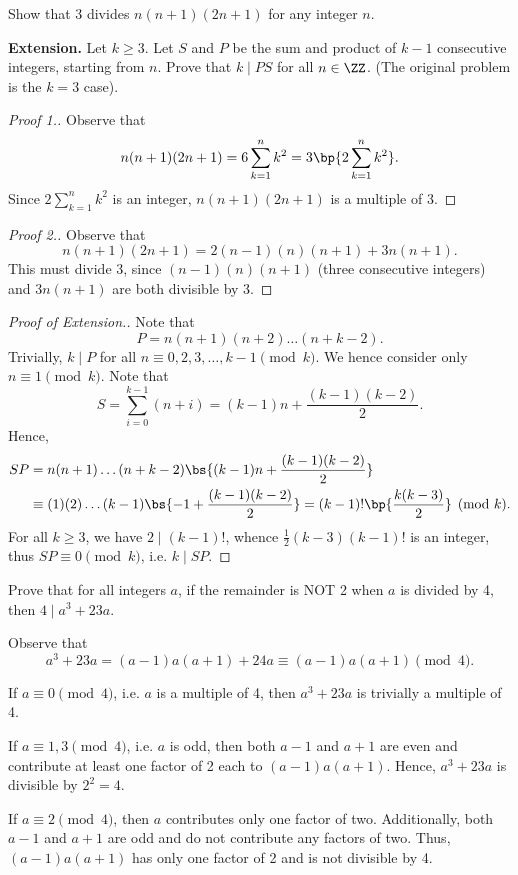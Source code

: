 \clearpage
\begin{problem}
    Show that 3 divides $n(n+1)(2n+1)$ for any integer $n$.

    \noindent\textbf{Extension.} Let $k \geq 3$. Let $S$ and $P$ be the sum and product of $k-1$ consecutive integers, starting from $n$. Prove that $k \mid PS$ for all $n \in \ZZ$. (The original problem is the $k = 3$ case).
\end{problem}
\begin{proof}[Proof 1.]
    Observe that \[n(n+1)(2n+1) = 6 \sum_{k = 1}^n k^2 = 3\bp{2\sum_{k = 1}^n k^2}.\] Since $2\sum_{k = 1}^n k^2$ is an integer, $n(n+1)(2n+1)$ is a multiple of 3.
\end{proof}
\begin{proof}[Proof 2.]
    Observe that \[n(n+1)(2n+1) = 2(n-1)(n)(n+1) + 3n(n+1).\] This must divide 3, since $(n-1)(n)(n+1)$ (three consecutive integers) and $3n(n+1)$ are both divisible by 3.
\end{proof}
\begin{proof}[Proof of Extension.]
    Note that \[P = n(n+1)(n+2)\dots(n+k-2).\] Trivially, $k \mid P$ for all $n \equiv 0, 2, 3, \dots, k-1 \pmod{k}$. We hence consider only $n \equiv 1 \pmod{k}$. Note that \[S = \sum_{i = 0}^{k-1} (n + i) = (k-1)n + \frac{(k-1)(k-2)}{2}.\] Hence,
    \begin{align*}
        SP &= n(n+1)\dots(n+k-2) \bs{(k-1)n + \frac{(k-1)(k-2)}{2}}\\
        &\equiv (1)(2)\dots(k-1) \bs{-1 + \frac{(k-1)(k-2)}{2}} = (k-1)! \bp{\frac{k(k-3)}{2}} \pmod{k}.
    \end{align*}
    For all $k \geq 3$, we have $2 \mid (k-1)!$, whence $\frac12 (k-3) (k-1)!$ is an integer, thus $SP \equiv 0 \pmod{k}$, i.e. $k \mid SP$.
\end{proof}

\begin{problem}
    Prove that for all integers $a$, if the remainder is NOT 2 when $a$ is divided by 4, then $4 \mid a^3 + 23 a$.
\end{problem}
\begin{solution}
    Observe that \[a^3 + 23 a = (a-1)a(a+1) + 24a \equiv (a-1)a(a+1) \pmod{4}.\]

     If $a \equiv 0 \pmod{4}$, i.e. $a$ is a multiple of 4, then $a^3 + 23a$ is trivially a multiple of 4.

     If $a \equiv 1, 3 \pmod{4}$, i.e. $a$ is odd, then both $a-1$ and $a+1$ are even and contribute at least one factor of 2 each to $(a-1)a(a+1)$. Hence, $a^3 + 23a$ is divisible by $2^2 = 4$.
    
     If $a \equiv 2 \pmod{4}$, then $a$ contributes only one factor of two. Additionally, both $a-1$ and $a+1$ are odd and do not contribute any factors of two. Thus, $(a-1)a(a+1)$ has only one factor of 2 and is not divisible by 4.
\end{solution}

